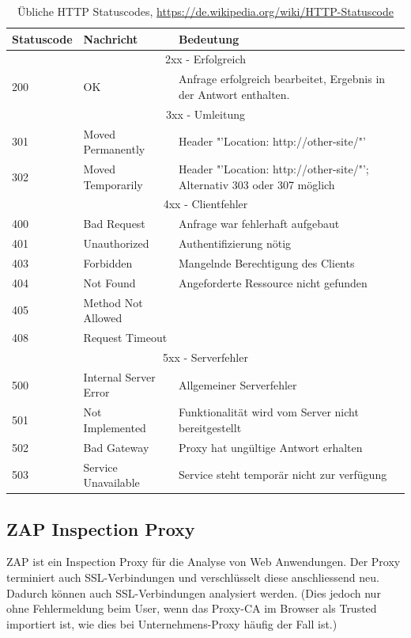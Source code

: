 \begin{table}[H]
	\begin{tabularx}{\textwidth}{l|p{100pt}|X}
		\textbf{Statuscode} & \textbf{Nachricht} & \textbf{Bedeutung}\\ \hline
		\multicolumn{3}{c}{2xx - Erfolgreich} \\ \hline
		200 & OK & Anfrage erfolgreich bearbeitet, Ergebnis in der Antwort enthalten. \\ \hline
		\multicolumn{3}{c}{3xx - Umleitung} \\ \hline
		301 & Moved Permanently & Header "'Location: http://other-site/"' \\ \hline
		302 & Moved Temporarily & Header "'Location: http://other-site/"'; Alternativ 303 oder 307 möglich \\ \hline
		\multicolumn{3}{c}{4xx - Clientfehler} \\ \hline
		400 & Bad Request & Anfrage war fehlerhaft aufgebaut \\ \hline
		401 & Unauthorized & Authentifizierung nötig \\ \hline
		403 & Forbidden & Mangelnde Berechtigung des Clients \\ \hline
		404 & Not Found & Angeforderte Ressource nicht gefunden \\ \hline
		405 & Method Not Allowed & \\ \hline
		408 & Request Timeout & \\ \hline
		\multicolumn{3}{c}{5xx - Serverfehler} \\ \hline
		500 & Internal Server Error & Allgemeiner Serverfehler \\ \hline
		501 & Not Implemented & Funktionalität wird vom Server nicht bereitgestellt \\ \hline
		502 & Bad Gateway & Proxy hat ungültige Antwort erhalten \\ \hline
		503 & Service Unavailable & Service steht temporär nicht zur verfügung \\ \hline
	\end{tabularx}
	\caption{Übliche HTTP Statuscodes, \url{https://de.wikipedia.org/wiki/HTTP-Statuscode}}
\end{table}

\subsection{ZAP Inspection Proxy}
ZAP ist ein Inspection Proxy für die Analyse von Web Anwendungen. Der Proxy terminiert auch SSL-Verbindungen und verschlüsselt diese anschliessend neu. Dadurch können auch SSL-Verbindungen analysiert werden. (Dies jedoch nur ohne Fehlermeldung beim User, wenn das Proxy-CA im Browser als Trusted importiert ist, wie dies bei Unternehmens-Proxy häufig der Fall ist.)

